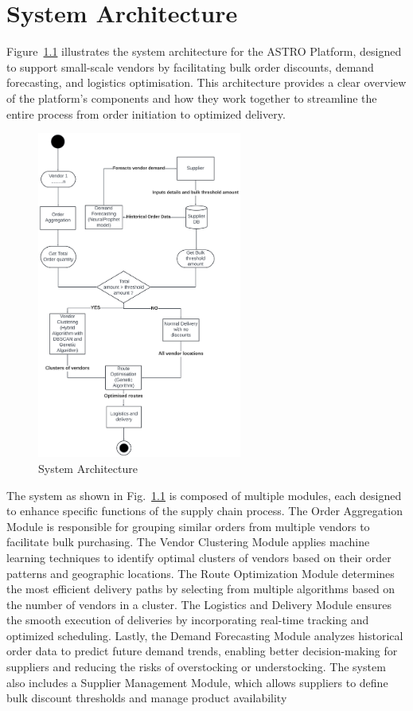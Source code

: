 \chapter{System Architecture}

\noindent Figure~\ref{fig:architecture} illustrates the system architecture for the ASTRO Platform, designed to support small-scale vendors by facilitating bulk order discounts, demand forecasting, and logistics optimisation. This architecture provides a clear overview of the platform’s components and how they work together to streamline the entire process from order initiation to optimized delivery.

\begin{figure}[h]
    \centering
    \includegraphics[width=0.6\textwidth]{Figures/sys_arch.pdf}
    \caption{System Architecture}
    \label{fig:architecture}
\end{figure}

\par The system as shown in Fig.~\ref{fig:architecture} is composed of multiple modules, each designed to enhance specific functions of the supply chain process. The Order Aggregation Module is responsible for grouping similar orders from multiple vendors to facilitate bulk purchasing. The Vendor Clustering Module applies machine learning techniques to identify optimal clusters of vendors based on their order patterns and geographic locations. The Route Optimization Module determines the most efficient delivery paths by selecting from multiple algorithms based on the number of vendors in a cluster. The Logistics and Delivery Module ensures the smooth execution of deliveries by incorporating real-time tracking and optimized scheduling. Lastly, the Demand Forecasting Module analyzes historical order data to predict future demand trends, enabling better decision-making for suppliers and reducing the risks of overstocking or understocking. The system also includes a Supplier Management Module, which allows suppliers to define bulk discount thresholds and manage product availability


